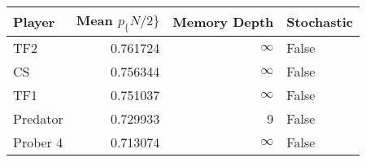 \begin{tabular}{lrrl}
\toprule
   Player &  Mean $p_\{N/2\}$ &  Memory Depth & Stochastic \\
\midrule
      TF2 &        0.761724 &            \(\infty\) &      False \\
       CS &        0.756344 &            \(\infty\) &      False \\
      TF1 &        0.751037 &            \(\infty\) &      False \\
 Predator &        0.729933 &             9 &      False \\
 Prober 4 &        0.713074 &            \(\infty\) &      False \\
\bottomrule
\end{tabular}
